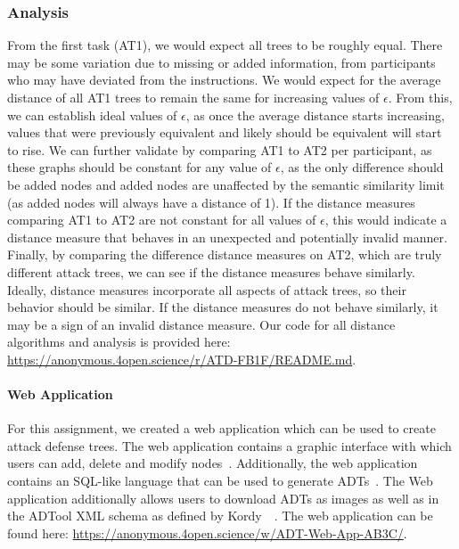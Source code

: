 \subsubsection{Analysis}
\label{ssec:method-analysis}
From the first task (AT1), we would expect all trees to be roughly equal. There may be some variation due to missing or added information, from participants who may have deviated from the instructions. We would expect for the average distance of all AT1 trees to remain the same for increasing values of $\epsilon$. From this, we can establish ideal values of $\epsilon$, as once the average distance starts increasing, values that were previously equivalent and likely should be equivalent will start to rise. We can further validate by comparing AT1 to AT2 per participant, as these graphs should be constant for any value of $\epsilon$, as the only difference should be added nodes and added nodes are unaffected by the semantic similarity limit (as added nodes will always have a distance of 1). If the distance measures comparing AT1 to AT2 are not constant for all values of $\epsilon$, this would indicate a distance measure that behaves in an unexpected and potentially invalid manner. Finally, by comparing the difference distance measures on AT2, which are truly different attack trees, we can see if the distance measures behave similarly. Ideally, distance measures incorporate all aspects of attack trees, so their behavior should be similar. If the distance measures do not behave similarly, it may be a sign of an invalid distance measure. Our code for all distance algorithms and analysis is provided here: \url{https://anonymous.4open.science/r/ATD-FB1F/README.md}.

\paragraph{Web Application}

For this assignment, we created a web application which can be used to create attack defense trees. The web application contains a graphic interface with which users can add, delete and modify nodes~\cite{mohalaiaImplementingUserInterface2023}. Additionally, the web application contains an SQL-like language that can be used to generate ADTs~\cite{mezaADTLangDeclarativeLanguage2023}. The Web application additionally allows users to download ADTs as images as well as in the ADTool XML schema as defined by Kordy~\etal~\cite{kordy_adtool_2013}. The web application can be found here: \url{https://anonymous.4open.science/w/ADT-Web-App-AB3C/}.

